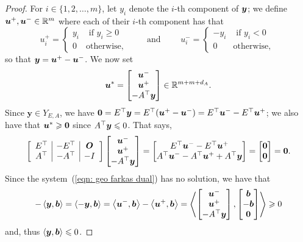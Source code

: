 \begin{proof}
For $i\in\{1,2,\dots, m\}$, let $y_i$ denote the $i$-th component of ${\boldsymbol y}$; we define ${\boldsymbol u}^+, {\boldsymbol u}^-\in\mathbb R^m$ where each of their $i$-th component has that 
\[ u_i^+ = \left\{\begin{array}{ll} y_i & \text{ if } y_i\geq 0\\ 0 & \text{otherwise},
 \end{array} \right.
\qquad\text{ and }\qquad
 u_i^- = \left\{\begin{array}{ll} -y_i & \text{ if } y_i < 0 \\ 0 & \text{otherwise, }
  \end{array} \right.
\]
so that ${\boldsymbol y} = {\boldsymbol u}^+ - {\boldsymbol u}^-$. We now set 
\[{{\boldsymbol u}^\ast} = \begin{bmatrix}{\boldsymbol u}^-\\ {\boldsymbol u}^+\\ - A^\top {\boldsymbol y} \end{bmatrix}\in\mathbb R^{m + m + d_A}. \] 
Since $\bm y\in Y_{E, A}$, we have $\boldsymbol 0  = E^\top {\boldsymbol y} = E^\top({\boldsymbol u}^+ - {\boldsymbol u}^-) =  E^\top{\boldsymbol u}^- -E^\top{\boldsymbol u}^+$; we also have that ${{\boldsymbol u}^\ast} \geqslant \boldsymbol 0$ since $A^\top{\boldsymbol y} \leqslant0$.  That says, 
\[
\left[\begin{array}{c|c|c} E^\top & -E^\top & \boldsymbol O \\ A^\top & -A^\top & - I \end{array}\right]\begin{bmatrix}{\boldsymbol u}^-\\ {\boldsymbol u}^+\\ - A^\top {\boldsymbol y} \end{bmatrix} = 
\begin{bmatrix} 
E^\top{\boldsymbol u}^- -E^\top{\boldsymbol u}^+ \\ 
A^\top{\boldsymbol u}^- - A^\top{\boldsymbol u}^+ + A^\top {\boldsymbol y} 
\end{bmatrix} = \begin{bmatrix} \boldsymbol 0 \\ \boldsymbol0 \end{bmatrix} = \boldsymbol0. 
\] 
Since the system~(\ref{eqn: geo farkas dual}) has no solution, we have that 
\[- \left\langle{\boldsymbol y}, {\boldsymbol b}\right\rangle = \left\langle-{\boldsymbol y}, {\boldsymbol b}\right\rangle = \left\langle {\boldsymbol u}^-, {\boldsymbol b}\right\rangle - \left\langle{\boldsymbol u}^+, {\boldsymbol b}\right\rangle  =  \left\langle
\begin{bmatrix}{\boldsymbol u}^-\\ {\boldsymbol u}^+\\ - A^\top {\boldsymbol y}  \end{bmatrix},
\begin{bmatrix} {\boldsymbol b}\\ -{\boldsymbol b}\\ \boldsymbol0 \end{bmatrix}
\right\rangle \geqslant 0 \] and, thus $\left\langle{\boldsymbol y}, {\boldsymbol b}\right\rangle\leqslant 0$. 
\end{proof}

